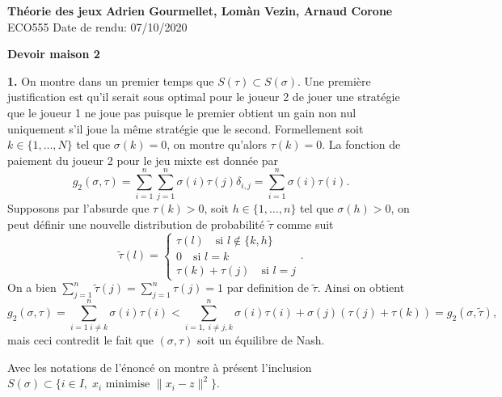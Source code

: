 \documentclass[12pt]{article}
\begin{document}
        \noindent
\textbf{Théorie des jeux} \hfill \textbf{Adrien Gourmellet, Lomàn Vezin, Arnaud Corone}\\
\normalsize ECO555 \hfill Date de rendu: 07/10/2020\\

\begin{center}
\textbf{Devoir maison 2}
\end{center}

\textbf{1.} On montre dans un premier temps que $S(\tau) \subset S(\sigma)$. Une première justification est qu'il serait sous optimal pour le joueur 2 de jouer une stratégie que le joueur 1 ne joue pas puisque le premier obtient un gain non nul uniquement s'il joue la même stratégie que le second. Formellement soit $k \in \{1, \ldots, N\}$ tel que $\sigma(k) = 0$, on montre qu'alors $\tau(k) = 0$. La fonction de paiement du joueur 2 pour le jeu mixte est donnée par \[
        g_{2}(\sigma, \tau) = \sum_{i=1}^{n} \sum_{j=1}^{n} \sigma(i)\tau(j)\delta_{i,j} = \sum_{i=1}^{n} \sigma(i)\tau(i)
.\] 
Supposons par l'absurde que $\tau(k) > 0$, soit $h \in \{1, \ldots, n\}$ tel que $\sigma(h) > 0$, on peut définir une nouvelle distribution de probabilité $\tilde{\tau}$ comme suit  \[
        \tilde{\tau}(l) = \begin{cases}
                \tau(l) \quad \text{si } l \not\in \{k, h\} \\
                0 \quad \text{si } l = k \\
                \tau(k) + \tau(j) \quad \text{si } l = j
        \end{cases}
.\] 
On a bien $\sum_{j=1}^{n} \tilde{\tau}(j) = \sum_{j=1}^{n} \tau(j) = 1$ par definition de $\tilde{\tau}$. 
Ainsi on obtient \[
        g_{2}(\sigma, \tau) = \sum_{i=1 \; i \neq k}^{n} \sigma(i)\tau(i) < \sum_{i=1,\; i \neq j, k}^{n} \sigma(i)\tau(i) + \sigma(j)(\tau(j)+\tau(k)) = g_{2}(\sigma, \tilde{\tau})
,\] 
mais ceci contredit le fait que $(\sigma, \tau)$ soit un équilibre de Nash.    

\medskip

Avec les notations de l'énoncé on montre à présent l'inclusion $S(\sigma) \subset \{i \in I, \; x_{i} \text{ minimise } \|x_{i}-z\|^{2}\}$.
\end{document}
